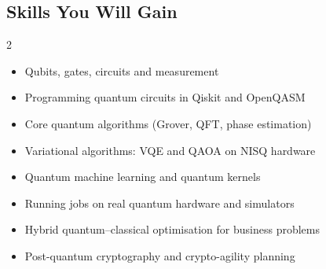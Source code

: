 \documentclass[10pt,a4paper]{article}
\begin{document}
\subsection*{Skills You Will Gain}\begin{multicols}{2}\begin{itemize}\small
\item Qubits, gates, circuits and measurement
\item Programming quantum circuits in Qiskit and OpenQASM
\item Core quantum algorithms (Grover, QFT, phase estimation)
\item Variational algorithms: VQE and QAOA on NISQ hardware
\item Quantum machine learning and quantum kernels
\item Running jobs on real quantum hardware and simulators
\item Hybrid quantum–classical optimisation for business problems
\item Post-quantum cryptography and crypto-agility planning
\end{itemize}\end{multicols}
\end{document}
